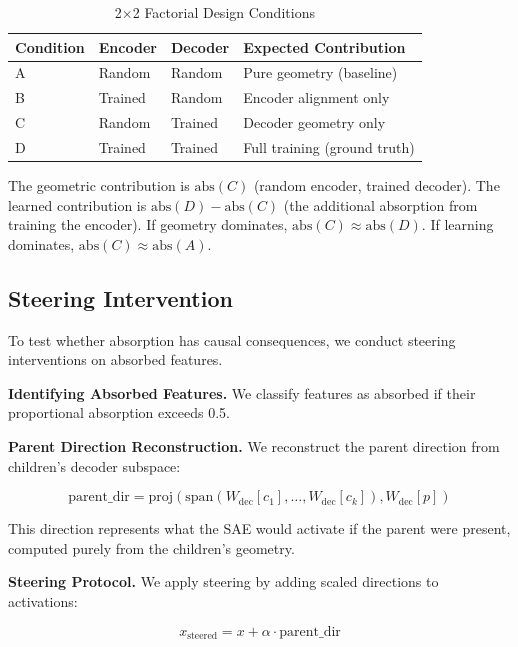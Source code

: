 \documentclass{article}
\begin{document}
\begin{table}[h]
\caption{2$\times$2 Factorial Design Conditions}
\label{tab:factorial_design}
\centering
\begin{tabular}{llll}
\toprule
Condition & Encoder & Decoder & Expected Contribution \\
\midrule
A & Random & Random & Pure geometry (baseline) \\
B & Trained & Random & Encoder alignment only \\
C & Random & Trained & Decoder geometry only \\
D & Trained & Trained & Full training (ground truth) \\
\bottomrule
\end{tabular}
\end{table}

The geometric contribution is $\text{abs}(C)$ (random encoder, trained decoder). The learned contribution is $\text{abs}(D) - \text{abs}(C)$ (the additional absorption from training the encoder). If geometry dominates, $\text{abs}(C) \approx \text{abs}(D)$. If learning dominates, $\text{abs}(C) \approx \text{abs}(A)$.

\subsection{Steering Intervention}

To test whether absorption has causal consequences, we conduct steering interventions on absorbed features.

\textbf{Identifying Absorbed Features.} We classify features as absorbed if their proportional absorption exceeds 0.5.

\textbf{Parent Direction Reconstruction.} We reconstruct the parent direction from children's decoder subspace:

\begin{equation}
\text{parent\_dir} = \text{proj}(\text{span}(W_{\text{dec}}[c_1], \ldots, W_{\text{dec}}[c_k]), W_{\text{dec}}[p])
\end{equation}

This direction represents what the SAE would activate if the parent were present, computed purely from the children's geometry.

\textbf{Steering Protocol.} We apply steering by adding scaled directions to activations:

\begin{equation}
x_{\text{steered}} = x + \alpha \cdot \text{parent\_dir}
\end{equation}
\end{document}
